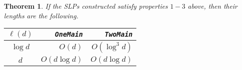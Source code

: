 \documentclass[12pt]{article}
\newtheorem{theorem}[definition]{Theorem}
\begin{document}
\begin{theorem} 
If the {\rm SLPs} constructed satisfy properties $1-3$ above,
then their lengths are the following.
\begin{center}
\begin{tabular}
{|c|r|r|} \hline
$\ell (d)$  &   {\tt OneMain}  & {\tt TwoMain} \rule{0cm}{2.5ex}\\
\hline
$\log d$  &  $O(d)$ &   $O(\log^3 d)$    \rule{0cm}{2.5ex}\\ \hline
$d$  &  $O(d \log d)$ &   $O(d \log d)$    \rule{0cm}{2.5ex}\\ \hline
\end{tabular}
\end{center}

\end{theorem}
\end{document}
